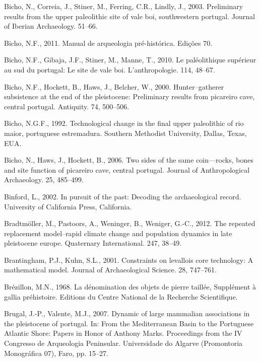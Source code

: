 \documentclass[12pt,twoside]{reedthesis}
\begin{document}
\leavevmode\hypertarget{ref-bicho2003}{}%
Bicho, N., Correia, J., Stiner, M., Ferring, C.R., Lindly, J., 2003. Preliminary results from the upper paleolithic site of vale boi, southwestern portugal. Journal of Iberian Archaeology. 51--66.

\leavevmode\hypertarget{ref-bicho2011}{}%
Bicho, N.F., 2011. Manual de arqueologia pré-histórica. Edições 70.

\leavevmode\hypertarget{ref-bichoetal2010}{}%
Bicho, N.F., Gibaja, J.F., Stiner, M., Manne, T., 2010. Le paléolithique supérieur au sud du portugal: Le site de vale boi. L'anthropologie. 114, 48--67.

\leavevmode\hypertarget{ref-bichoetal2000}{}%
Bicho, N.F., Hockett, B., Haws, J., Belcher, W., 2000. Hunter--gatherer subsistence at the end of the pleistocene: Preliminary results from picareiro cave, central portugal. Antiquity. 74, 500--506.

\leavevmode\hypertarget{ref-bicho1992}{}%
Bicho, N.G.F., 1992. Technological change in the final upper paleolithic of rio maior, portuguese estremadura. Southern Methodist University, Dallas, Texas, EUA.

\leavevmode\hypertarget{ref-bicho2006}{}%
Bicho, N., Haws, J., Hockett, B., 2006. Two sides of the same coin---rocks, bones and site function of picareiro cave, central portugal. Journal of Anthropological Archaeology. 25, 485--499.

\leavevmode\hypertarget{ref-binford2002}{}%
Binford, L., 2002. In pursuit of the past: Decoding the archaeological record. University of California Press, California.

\leavevmode\hypertarget{ref-bradtmoller2012}{}%
Bradtmöller, M., Pastoors, A., Weninger, B., Weniger, G.-C., 2012. The repeated replacement model--rapid climate change and population dynamics in late pleistocene europe. Quaternary International. 247, 38--49.

\leavevmode\hypertarget{ref-brantingham2001}{}%
Brantingham, P.J., Kuhn, S.L., 2001. Constraints on levallois core technology: A mathematical model. Journal of Archaeological Science. 28, 747--761.

\leavevmode\hypertarget{ref-brezillon1968}{}%
Brézillon, M.N., 1968. La dénomination des objets de pierre taillée, Supplément à gallia préhistoire. Editions du Centre National de la Recherche Scientifique.

\leavevmode\hypertarget{ref-brugal2007}{}%
Brugal, J.-P., Valente, M.J., 2007. Dynamic of large mammalian associations in the pleistocene of portugal. In: From the Mediterranean Basin to the Portuguese Atlantic Shore: Papers in Honor of Anthony Marks. Proceedings from the IV Congresso de Arqueologia Peninsular. Universidade do Algarve (Promontoria Monográfica 07), Faro, pp. 15--27.
\end{document}
